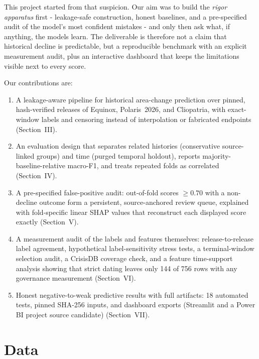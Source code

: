 \documentclass[conference]{IEEEtran}
\begin{document}
This project started from that suspicion. Our aim was to build the \emph{rigor
apparatus} first - leakage-safe construction, honest baselines, and a
pre-specified audit of the model's most confident mistakes - and only then ask
what, if anything, the models learn. The deliverable is therefore not a claim
that historical decline is predictable, but a reproducible benchmark with an
explicit measurement audit, plus an interactive dashboard that keeps the
limitations visible next to every score.

Our contributions are:
\begin{enumerate}
\item A leakage-aware pipeline for historical area-change prediction over pinned,
hash-verified releases of Equinox, Polaris~2026, and Cliopatria, with exact-window
labels and censoring instead of interpolation or fabricated endpoints
(Section~III).
\item An evaluation design that separates related histories (conservative
source-linked groups) and time (purged temporal holdout), reports
majority-baseline-relative macro-F1, and treats repeated folds as correlated
(Section~IV).
\item A pre-specified false-positive audit: out-of-fold scores $\geq 0.70$ with a
non-decline outcome form a persistent, source-anchored review queue, explained
with fold-specific linear SHAP values that reconstruct each displayed score
exactly (Section~V).
\item A measurement audit of the labels and features themselves: release-to-release
label agreement, hypothetical label-sensitivity stress tests, a terminal-window
selection audit, a CrisisDB coverage check, and a feature time-support analysis
showing that strict dating leaves only 144 of 756 rows with any governance
measurement (Section~VI).
\item Honest negative-to-weak predictive results with full artifacts: 18 automated
tests, pinned SHA-256 inputs, and dashboard exports (Streamlit and a Power BI
project source candidate) (Section~VII).
\end{enumerate}

\section{Data}
\label{sec:data}
\end{document}

